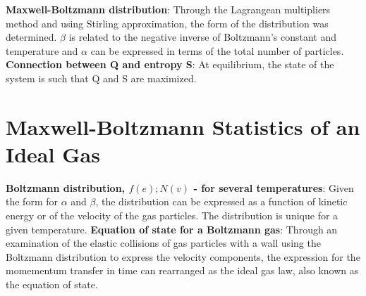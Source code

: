 \documentclass{article}
\numberwithin{equation}{section}
\begin{document}
\newline
\textbf{Maxwell-Boltzmann distribution}: Through the Lagrangean multipliers method and using Stirling approximation, the form of the distribution was determined. $\beta$ is related to the negative inverse of Boltzmann's constant and temperature and $\alpha$ can be expressed in terms of the total number of particles.
\newline
\textbf{Connection between Q and entropy S}: At equilibrium, the state of the system is such that Q and S are maximized.
\newline
\section*{Maxwell-Boltzmann Statistics of an Ideal Gas}
\textbf{Boltzmann distribution, $f(e);N(v)$ - for several temperatures}: Given the form for $\alpha$ and $\beta$, the distribution can be expressed as a function of kinetic energy or of the velocity of the gas particles. The distribution is unique for a given temperature.
\newline
\textbf{Equation of state for a Boltzmann gas}: Through an examination of the elastic collisions of gas particles with a wall using the Boltzmann distribution to express the velocity components, the expression for the momementum transfer in time can rearranged as the ideal gas law, also known as the equation of state.
\newline
\end{document}
